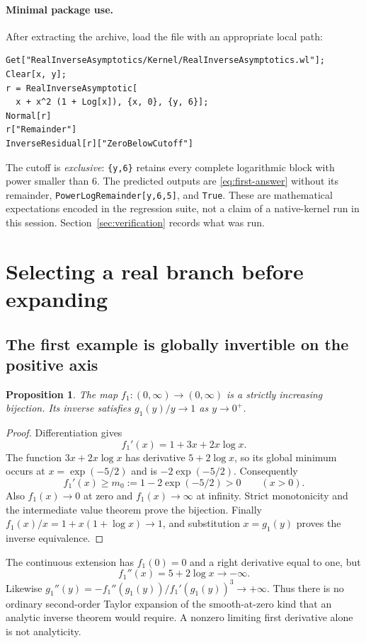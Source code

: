 \documentclass[11pt,a4paper]{article}
\numberwithin{equation}{section}
\newtheorem{proposition}[theorem]{Proposition}
\theoremstyle{definition}
\theoremstyle{remark}
\begin{document}
\paragraph{Minimal package use.}
After extracting the archive, load the file with an appropriate local path:
\begin{lstlisting}
Get["RealInverseAsymptotics/Kernel/RealInverseAsymptotics.wl"];
Clear[x, y];
r = RealInverseAsymptotic[
  x + x^2 (1 + Log[x]), {x, 0}, {y, 6}];
Normal[r]
r["Remainder"]
InverseResidual[r]["ZeroBelowCutoff"]
\end{lstlisting}
The cutoff is \emph{exclusive}: \texttt{\{y,6\}} retains every complete
logarithmic block with power smaller than $6$. The predicted outputs are
\eqref{eq:first-answer} without its remainder,
\texttt{PowerLogRemainder[y,6,5]}, and \texttt{True}. These are mathematical
expectations encoded in the regression suite, not a claim of a native-kernel
run in this session. Section~\ref{sec:verification} records what was run.

\section{Selecting a real branch before expanding}
\label{sec:branch}

\subsection{The first example is globally invertible on the positive axis}

\begin{proposition}
The map $f_1:(0,\infty)\to(0,\infty)$ is a strictly increasing bijection.
Its inverse satisfies $g_1(y)/y\to1$ as $y\to0^+$.
\end{proposition}
\begin{proof}
Differentiation gives
\[
 f_1'(x)=1+3x+2x\log x.
\]
The function $3x+2x\log x$ has derivative $5+2\log x$, so its global
minimum occurs at $x=\exp(-5/2)$ and is $-2\exp(-5/2)$. Consequently
\begin{equation}
 f_1'(x)\ge m_0:=1-2\exp(-5/2)>0\qquad(x>0).
 \label{eq:global-slope}
\end{equation}
Also $f_1(x)\to0$ at zero and $f_1(x)\to\infty$ at infinity. Strict
monotonicity and the intermediate value theorem prove the bijection.
Finally $f_1(x)/x=1+x(1+\log x)\to1$, and substitution $x=g_1(y)$ proves
the inverse equivalence.
\end{proof}

The continuous extension has $f_1(0)=0$ and a right derivative equal to one,
but
\[
 f_1''(x)=5+2\log x\longrightarrow-\infty.
\]
Likewise $g_1''(y)=-f_1''(g_1(y))/f_1'(g_1(y))^3\to+\infty$.
Thus there is no ordinary second-order Taylor expansion of the smooth-at-zero
kind that an analytic inverse theorem would require. A nonzero limiting
first derivative alone is not analyticity.
\end{document}
